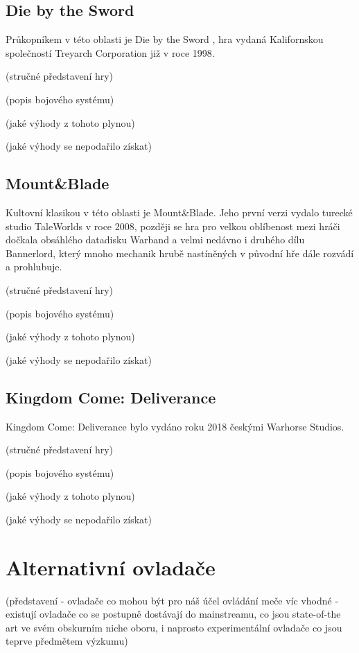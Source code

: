 \subsection{Die by the Sword}

Průkopníkem v této oblasti je Die by the Sword \cite{DieByTheSword}, hra vydaná Kalifornskou společností Treyarch Corporation již v roce 1998.

\clearpage
(stručné představení hry)

(popis bojového systému)

(jaké výhody z tohoto plynou)

(jaké výhody se nepodařilo získat)


\subsection{Mount\&Blade}

Kultovní klasikou v této oblasti je Mount\&Blade. Jeho první verzi vydalo turecké studio TaleWorlds v roce 2008, později se hra pro velkou oblíbenost mezi hráči dočkala obsáhlého datadisku Warband a velmi nedávno i druhého dílu Bannerlord, který mnoho mechanik hrubě nastíněných v původní hře dále rozvádí a prohlubuje.

\clearpage
(stručné představení hry)

(popis bojového systému)

(jaké výhody z tohoto plynou)

(jaké výhody se nepodařilo získat)

\subsection{Kingdom Come: Deliverance}

Kingdom Come: Deliverance bylo vydáno roku 2018 českými Warhorse Studios. 

\clearpage
(stručné představení hry)

(popis bojového systému)

(jaké výhody z tohoto plynou)

(jaké výhody se nepodařilo získat)


\section{Alternativní ovladače}

(představení - ovladače co mohou být pro náš účel ovládání meče víc vhodné - existují ovladače co se postupně dostávají do mainstreamu, co jsou state-of-the art ve svém obskurním niche oboru, i naprosto experimentální ovladače co jsou teprve předmětem výzkumu)

